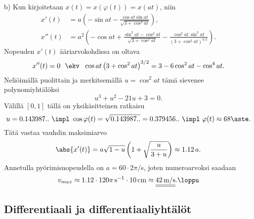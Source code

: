 b) Kun kirjoitetaan $x(t)=x(\varphi(t))=x(at)$, niin
\begin{align*}
x'(t)  &= a\left(-\sin at - \frac{\cos at\sin at}{\sqrt{3+\cos^2 at}}\right), \\
x''(t) &= a^2\left(-\cos at + \frac{\sin^2 at-\cos^2 at}{\sqrt{3+\cos^2 at}}
                            - \frac{\cos^2 at\,\sin^2 at}{(3+\cos^2 at)^{3/2}}\right).
\end{align*}
Nopeuden $x'(t)$ ääriarvokohdissa on oltava
\[
x''(t)=0\ \ \ekv\ \ \cos at\left(3+\cos^2 at\right)^{3/2} = 3-6\cos^2 at-\cos^4 at.
\]
Neliöimällä puolittain ja merkitsemällä $u=\cos^2 at$ tämä sievenee polynomiyhtälöksi
\[
u^3+u^2-21u+3=0.
\]
Välillä $[0,1]$ tällä on yksikäsitteinen ratkaisu
\[
u = 0.143987..\ \impl\ \cos\varphi(t) = \sqrt{0.143987..} = 0.379456..\ 
                \impl\ \varphi(t) \approx 68\aste.
\]
Tätä vastaa vauhdin maksimiarvo
\[
\abs{x'(t)} = a\sqrt{1-u}\left(1+\sqrt{\frac{u}{3+u}}\right) \approx 1.12\,a.
\]
Annetulla pyörimisnopeudella on $a=60 \cdot 2\pi/$s, joten numeroarvoksi saadaan
\[
v_{max} \approx 1.12 \cdot 120\pi\,\text{s}^{-1} \cdot 10\,\text{cm} 
                          \approx \underline{\underline{42\,\text{m/s}}}. \loppu
\]

\subsection*{Differentiaali ja differentiaaliyhtälöt}

